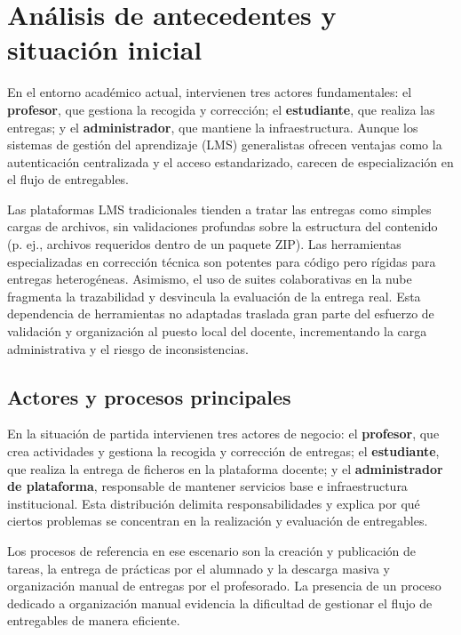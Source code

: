 \FloatBarrier
\section{An\'alisis de antecedentes y situaci\'on inicial}

En el entorno acad\'emico actual, intervienen tres actores fundamentales: el \textbf{profesor}, que gestiona la recogida y correcci\'on; el \textbf{estudiante}, que realiza las entregas; y el \textbf{administrador}, que mantiene la infraestructura. Aunque los sistemas de gesti\'on del aprendizaje (LMS) generalistas ofrecen ventajas como la autenticaci\'on centralizada y el acceso estandarizado, carecen de especializaci\'on en el flujo de entregables.

Las plataformas LMS tradicionales tienden a tratar las entregas como simples cargas de archivos, sin validaciones profundas sobre la estructura del contenido (p. ej., archivos requeridos dentro de un paquete ZIP). Las herramientas especializadas en correcci\'on t\'ecnica son potentes para c\'odigo pero r\'igidas para entregas heterog\'eneas. Asimismo, el uso de suites colaborativas en la nube fragmenta la trazabilidad y desvincula la evaluaci\'on de la entrega real. Esta dependencia de herramientas no adaptadas traslada gran parte del esfuerzo de validaci\'on y organizaci\'on al puesto local del docente, incrementando la carga administrativa y el riesgo de inconsistencias.

\subsection{Actores y procesos principales}

En la situaci\'on de partida intervienen tres actores de negocio: el \textbf{profesor}, que crea actividades y gestiona la recogida y correcci\'on de entregas; el \textbf{estudiante}, que realiza la entrega de ficheros en la plataforma docente; y el \textbf{administrador de plataforma}, responsable de mantener servicios base e infraestructura institucional. Esta distribuci\'on delimita responsabilidades y explica por qu\'e ciertos problemas se concentran en la realizaci\'on y evaluaci\'on de entregables.

Los procesos de referencia en ese escenario son la creaci\'on y publicaci\'on de tareas, la entrega de pr\'acticas por el alumnado y la descarga masiva y organizaci\'on manual de entregas por el profesorado. La presencia de un proceso dedicado a organizaci\'on manual evidencia la dificultad de gestionar el flujo de entregables de manera eficiente.


